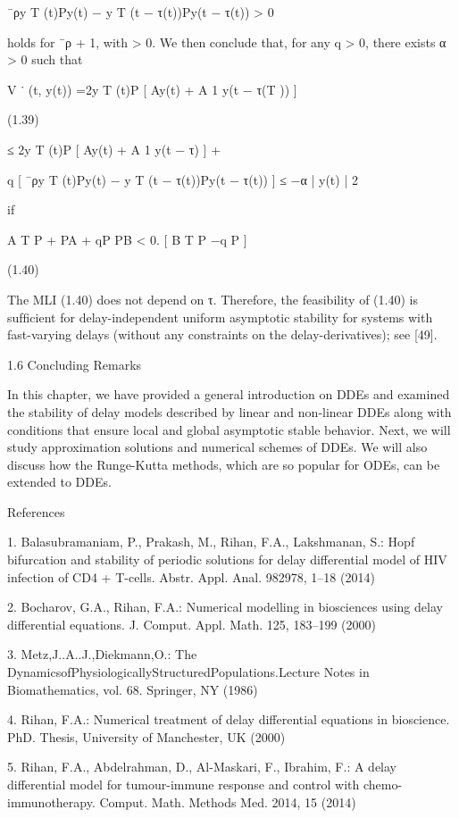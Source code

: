 \documentclass[12pt]{article}
\begin{document}
¯ρy T (t)Py(t) − y T (t − τ(t))Py(t − τ(t)) > 0

holds for ¯ρ + 1, with  > 0. We then conclude that, for any q > 0, there exists α > 0 such that

V ˙ (t, y(t)) =2y T (t)P [ Ay(t) + A 1 y(t − τ(T )) ]

(1.39)

≤ 2y T (t)P [ Ay(t) + A 1 y(t − τ) ] +

q [ ¯ρy T (t)Py(t) − y T (t − τ(t))Py(t − τ(t)) ] ≤ −α | y(t) | 2

if

A T P + PA + qP PB < 0. [ B T P −q P ]

(1.40)

The MLI (1.40) does not depend on τ. Therefore, the feasibility of (1.40) is sufﬁcient for delay-independent uniform asymptotic stability 
for systems with fast-varying delays (without any constraints on the delay-derivatives); see [49].

1.6 Concluding Remarks

In this chapter, we have provided a general introduction on DDEs and examined the stability of delay models described by linear and 
non-linear DDEs along with conditions that ensure local and global asymptotic stable behavior. Next, we will study approximation solutions 
and numerical schemes of DDEs. We will also discuss how the Runge-Kutta methods, which are so popular for ODEs, can be extended to DDEs.

References

1. Balasubramaniam, P., Prakash, M., Rihan, F.A., Lakshmanan, S.: Hopf bifurcation and stability of periodic solutions for delay differential 
model of HIV infection of CD4 + T-cells. Abstr. Appl. Anal. 982978, 1–18 (2014)

2. Bocharov, G.A., Rihan, F.A.: Numerical modelling in biosciences using delay differential equations. J. Comput. Appl. Math. 125, 183–199 
(2000)

3. Metz,J..A..J.,Diekmann,O.: The DynamicsofPhysiologicallyStructuredPopulations.Lecture Notes in Biomathematics, vol. 68. Springer, NY 
(1986)

4. Rihan, F.A.: Numerical treatment of delay differential equations in bioscience. PhD. Thesis, University of Manchester, UK (2000)

5. Rihan, F.A., Abdelrahman, D., Al-Maskari, F., Ibrahim, F.: A delay differential model for tumour-immune response and control with 
chemo-immunotherapy. Comput. Math. Methods Med. 2014, 15 (2014)
\end{document}
